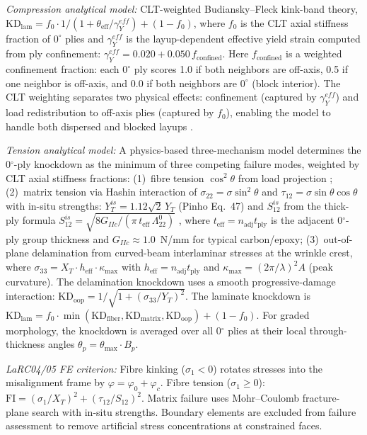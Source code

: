 \documentclass[10pt,a4paper]{article}
\begin{document}
\begin{description}[leftmargin=1.5em,labelindent=0em]
\textit{Compression analytical model:} CLT-weighted Budiansky--Fleck kink-band theory, $\text{KD}_{\text{lam}} = f_0 \cdot 1/(1+\theta_{\text{eff}}/\gamma_Y^{eff}) + (1-f_0)$, where $f_0$ is the CLT axial stiffness fraction of $0^\circ$ plies and $\gamma_Y^{eff}$ is the layup-dependent effective yield strain computed from ply confinement: $\gamma_Y^{eff} = 0.020 + 0.050\,f_{\text{confined}}$.
Here $f_{\text{confined}}$ is a weighted confinement fraction: each $0^\circ$ ply scores 1.0 if both neighbors are off-axis, 0.5 if one neighbor is off-axis, and 0.0 if both neighbors are $0^\circ$ (block interior).
The CLT weighting separates two physical effects: confinement (captured by $\gamma_Y^{eff}$) and load redistribution to off-axis plies (captured by $f_0$), enabling the model to handle both dispersed and blocked layups \citep{Fleck1997,Pimenta2015}.

\textit{Tension analytical model:} A physics-based three-mechanism model determines the 0$^\circ$-ply knockdown as the minimum of three competing failure modes, weighted by CLT axial stiffness fractions:
(1)~fibre tension $\cos^2\theta$ from load projection \citep{Pinho2005};
(2)~matrix tension via Hashin interaction of $\sigma_{22} = \sigma\sin^2\theta$ and $\tau_{12} = \sigma\sin\theta\cos\theta$ with in-situ strengths: $Y_T^{is} = 1.12\sqrt{2}\,Y_T$ (Pinho Eq.~47) and $S_{12}^{is}$ from the thick-ply formula $S_{12}^{is} = \sqrt{8G_{IIc}/(\pi\,t_{\text{eff}}\,\Lambda_{22}^0)}$ \citep{Camanho2006}, where $t_{\text{eff}} = n_{\text{adj}} t_{\text{ply}}$ is the adjacent 0$^\circ$-ply group thickness and $G_{IIc} \approx 1.0$~N/mm for typical carbon/epoxy;
(3)~out-of-plane delamination from curved-beam interlaminar stresses at the wrinkle crest, where $\sigma_{33} = X_T \cdot h_{\text{eff}} \cdot \kappa_{\max}$ with $h_{\text{eff}} = n_{\text{adj}} t_{\text{ply}}$ and $\kappa_{\max} = (2\pi/\lambda)^2 A$ (peak curvature).
The delamination knockdown uses a smooth progressive-damage interaction: $\text{KD}_{\text{oop}} = 1/\sqrt{1 + (\sigma_{33}/Y_T)^2}$.
The laminate knockdown is $\text{KD}_{\text{lam}} = f_0 \cdot \min(\text{KD}_{\text{fiber}}, \text{KD}_{\text{matrix}}, \text{KD}_{\text{oop}}) + (1-f_0)$.
For graded morphology, the knockdown is averaged over all 0$^\circ$ plies at their local through-thickness angles $\theta_p = \theta_{\max} \cdot B_p$.

\textit{LaRC04/05 FE criterion:}
Fibre kinking ($\sigma_1 < 0$) rotates stresses into the misalignment frame by $\varphi = \varphi_0 + \varphi_c$.
Fibre tension ($\sigma_1 \geq 0$): $\text{FI} = (\sigma_1/X_T)^2 + (\tau_{12}/S_{12})^2$.
Matrix failure uses Mohr--Coulomb fracture-plane search with in-situ strengths.
Boundary elements are excluded from failure assessment to remove artificial stress concentrations at constrained faces.


\end{description}
\end{document}
